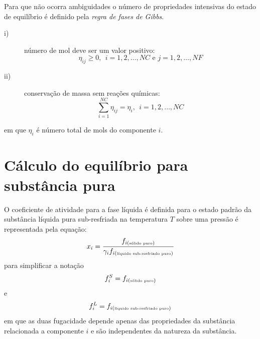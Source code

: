 Para que não ocorra ambiguidades o número de propriedades intensivas do estado de equilíbrio é definido pela \textit{regra de fases de Gibbs}. \cite{Prausnitz}
	

	\begin{description}
		\item[i)] número de mol deve ser um valor positivo:
		\begin{equation}
		\eta_{ij}\geqslant 0,\  \ i=1,2,\ldots,NC \mbox{ e } j=1,2,\ldots,NF
		\end{equation}
		\item[ii)] conservação de massa sem reações químicas:
		\begin{equation}
		\sum_{i=1}^{NC}\eta_{ij}=\eta_{i},\  \ i=1,2,\ldots,NC
		\end{equation}
	\end{description}
	em que $\eta_{i}$ é número total de mols do componente $i$.
	\cite{Sandlel,Barbosa2012,Prausnitz}
	
	\section{Cálculo do equilíbrio para substância pura}
	
	\hspace{5mm} O coeficiente de atividade para a fase líquida é definida para o estado padrão da substância líquida pura sub-resfriada na temperatura $T$ sobre uma pressão é representada pela equação:
	\begin{equation}\label{eq:atividade_1}x_i=\frac{f_{i(\mbox{\tiny sólido puro})}}{\gamma_{i}f_{i(\mbox{\tiny líquido sub-resfriado puro})}}
	\end{equation}
	para simplificar a notação
	\begin{equation*}
	f_{i}^{S}=f_{i(\mbox{\tiny sólido puro})}
	\end{equation*}
	e
	\begin{equation*}
	f_{i}^{L}=f_{i(\mbox{\tiny líquido sub-resfriado puro})}
	\end{equation*}
	em que as duas fugacidade depende apenas das propriedades da substância relacionada a componente $i$ e são independentes da natureza da substância. %
	

